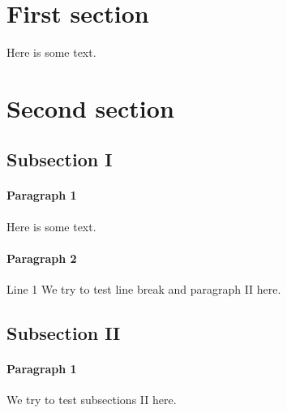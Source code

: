 \documentclass{mockDoc}
\begin{document}
\section{First section}
Here is some text.
\section{Second section}
\subsection{Subsection I}
\paragraph{Paragraph 1}
Here is some text.
\paragraph{Paragraph 2}
Line 1 \newline
We try to test line break and paragraph II here.
\subsection{Subsection II}
\paragraph{Paragraph 1}
We try to test subsections II here.
\end{document}
